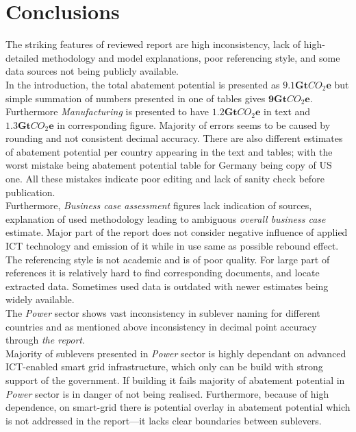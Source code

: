 \documentclass[11pt, twocolumn]{article}
\begin{document}
\section{Conclusions}
The striking features of reviewed report are high inconsistency, lack of high-detailed methodology and model explanations, poor referencing style, and some data sources not being publicly available.\\

In the introduction, the total abatement potential is presented as $\mathbf{9.1} \mathbf{Gt}CO_2\mathbf{e}$ but simple summation of numbers presented in one of tables gives $\mathbf{9} \mathbf{Gt}CO_2\mathbf{e}$. Furthermore \emph{Manufacturing} is presented to have $\mathbf{1.2} \mathbf{Gt}CO_2\mathbf{e}$ in text and $\mathbf{1.3} \mathbf{Gt}CO_2\mathbf{e}$ in corresponding figure. Majority of errors seems to be caused by rounding and not consistent decimal accuracy. There are also different estimates of abatement potential per country appearing in the text and tables; with the worst mistake being abatement potential table for Germany being copy of US one. All these mistakes indicate poor editing and lack of sanity check before publication.\\

Furthermore, \emph{Business case assessment} figures lack indication of sources, explanation of used methodology leading to ambiguous \emph{overall business case} estimate. Major part of the report does not consider negative influence of applied ICT technology and emission of it while in use same as possible rebound effect.\\

The referencing style is not academic and is of poor quality. For large part of references it is relatively hard to find corresponding documents, and locate extracted data. Sometimes used data is outdated with newer estimates being widely available.\\

The \emph{Power} sector shows vast inconsistency in sublever naming for different countries and as mentioned above inconsistency in decimal point accuracy through \emph{the report}.\\

Majority of sublevers presented in \emph{Power} sector is highly dependant on advanced ICT-enabled smart grid infrastructure, which only can be build with strong support of the government. If building it fails majority of abatement potential in \emph{Power} sector is in danger of not being realised. Furthermore, because of high dependence, on smart-grid there is potential overlay in abatement potential which is not addressed in the report---it lacks clear boundaries between sublevers.\\
\end{document}
